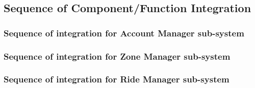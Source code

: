 \documentclass[a4paper,11pt]{report} %
\begin{document}
	\subsection{Sequence of Component/Function Integration}
		\subsubsection{Sequence of integration for Account Manager sub-system} \label{sec:2.4.1}
			\begin{minipage}{\linewidth}
			\end{minipage}
		
		\subsubsection{Sequence of integration for Zone Manager sub-system} \label{sec:2.4.2}
		\begin{minipage}{\linewidth}
		\end{minipage}		
		
		\subsubsection{Sequence of integration for Ride Manager sub-system} \label{sec:2.4.3}
		\begin{minipage}{\linewidth}
		\end{minipage}				
			
\end{document}
